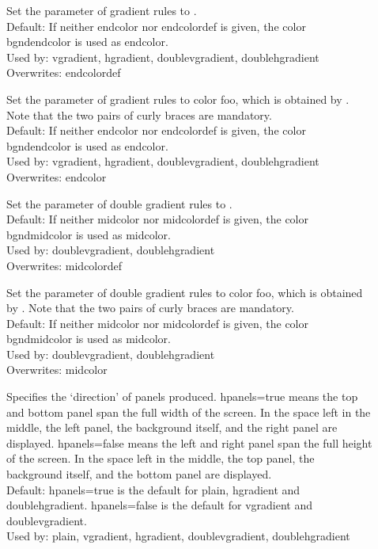 \documentclass[12pt]{scrartcl}
\begin{document}
\begin{description}
  \item[]
    Set the  parameter of gradient rules to .\\
    Default: If neither endcolor nor endcolordef is given, the color
      bgndendcolor is used as endcolor.\\
    Used by: vgradient, hgradient, doublevgradient, doublehgradient\\
    Overwrites: endcolordef

 \item[]
    Set the  parameter of gradient rules to color foo, which
    is obtained by .
    Note that the two pairs of curly braces are mandatory.\\
    Default: If neither endcolor nor endcolordef is given, the color
      bgndendcolor is used as endcolor.\\
    Used by: vgradient, hgradient, doublevgradient, doublehgradient\\
    Overwrites: endcolor

  \item[]
    Set the  parameter of double gradient rules to .\\
    Default: If neither midcolor nor midcolordef is given, the color
      bgndmidcolor is used as midcolor.\\
    Used by: doublevgradient, doublehgradient\\
    Overwrites: midcolordef

  \item[]
    Set the  parameter of double gradient rules to color foo,
    which is obtained by .
    Note that the two pairs of curly braces are mandatory.\\
    Default: If neither midcolor nor midcolordef is given, the color
      bgndmidcolor is used as midcolor.\\
    Used by: doublevgradient, doublehgradient\\
    Overwrites: midcolor

 \item[]
    Specifies the `direction' of panels produced. hpanels=true means the top
    and bottom panel span the full width of the screen. In the space left in
    the middle, the left panel, the background itself, and the right panel are
    displayed. hpanels=false means the left and right panel span the full
    height of the screen. In the space left in the middle, the top panel,
    the background itself, and the bottom panel are
    displayed.\\
    Default: hpanels=true is the default for plain, hgradient and
      doublehgradient. hpanels=false is the default for vgradient and
      doublevgradient.\\
    Used by: plain, vgradient, hgradient, doublevgradient, doublehgradient


\end{description}
\end{document}
